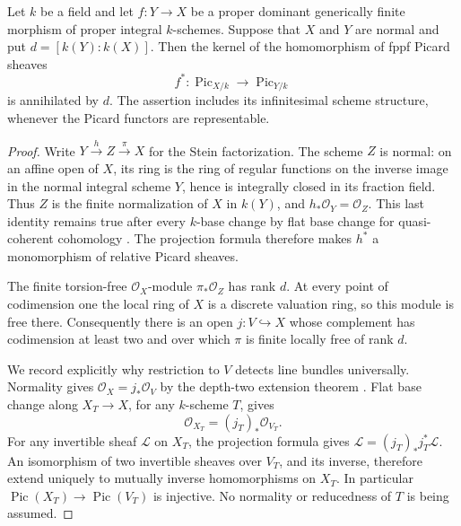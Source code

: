\begin{lemma}\label{C:B2-alteration-kernel}
Let $k$ be a field and let $f:Y\to X$ be a proper dominant
generically finite morphism of proper integral $k$-schemes.  Suppose
that $X$ and $Y$ are normal and put $d=[k(Y):k(X)]$.  Then the kernel
of the homomorphism of fppf Picard sheaves
\[
 f^*:\operatorname{Pic}_{X/k}\longrightarrow
       \operatorname{Pic}_{Y/k}
\]
is annihilated by $d$.  The assertion includes its infinitesimal
scheme structure, whenever the Picard functors are representable.
\end{lemma}
\begin{proof}
Write $Y\xrightarrow{h}Z\xrightarrow{\pi}X$ for the Stein
factorization.  The scheme $Z$ is normal: on an affine open of $X$,
its ring is the ring of regular functions on the inverse image in
the normal integral scheme $Y$, hence is integrally closed in its
fraction field.  Thus $Z$ is the finite normalization of $X$ in
$k(Y)$, and $h_*\mathcal O_Y=\mathcal O_Z$.
This last identity remains true after every $k$-base change by flat
base change for quasi-coherent cohomology
\cite[Lemma 30.5.2, Tag 02KH]{C_StacksPicNorm}.
The projection formula therefore makes $h^*$ a monomorphism of
relative Picard sheaves.

The finite torsion-free $\mathcal O_X$-module $\pi_*\mathcal O_Z$
has rank $d$.  At every point of codimension one the local ring of
$X$ is a discrete valuation ring, so this module is free there.
Consequently there is an open $j:V\hookrightarrow X$ whose complement
has codimension at least two and over which $\pi$ is finite locally
free of rank $d$.

We record explicitly why restriction to $V$ detects line bundles
universally.  Normality gives $\mathcal O_X=j_*\mathcal O_V$ by
the depth-two extension theorem
\cite[Lemma 31.13.12, Tag 0EBJ]{C_StacksPicNorm}.
Flat base change along $X_T\to X$, for any $k$-scheme $T$, gives
\[
 \mathcal O_{X_T}=(j_T)_*\mathcal O_{V_T}.
\]
For any invertible sheaf $\mathcal L$ on $X_T$, the projection
formula gives $\mathcal L=(j_T)_*j_T^*\mathcal L$.
An isomorphism of two invertible sheaves over $V_T$, and its inverse,
therefore extend uniquely to mutually inverse homomorphisms on $X_T$.
In particular $\operatorname{Pic}(X_T)\to\operatorname{Pic}(V_T)$
is injective.  No normality or reducedness of $T$ is being assumed.


\end{proof}
